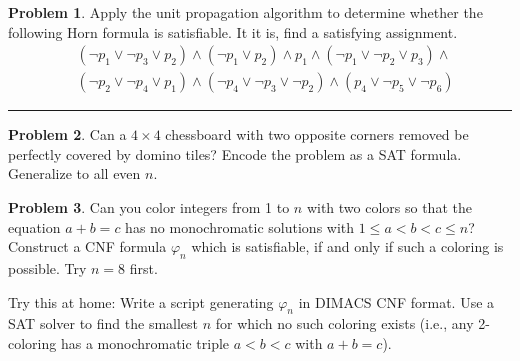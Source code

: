 \documentclass{amsart}
\theoremstyle{definition}
\newtheorem{problem}{Problem}
\begin{document}
\bigskip\begin{problem}
Apply the unit propagation algorithm to determine whether the following Horn formula is satisfiable. It it is, find a satisfying assignment.
\begin{align*}
&(\neg p_1 \vee \neg p_3 \vee p_2)\wedge(\neg p_1 \vee p_2)\wedge p_1 \wedge (\neg p_1 \vee \neg p_2 \vee p_3)\wedge \\
&(\neg p_2 \vee \neg p_4 \vee p_1)\wedge(\neg p_4 \vee \neg p_3 \vee \neg p_2)\wedge(p_4\vee \neg p_5 \vee\neg p_6)
\end{align*}
\end{problem}



\hrule















\bigskip\begin{problem}
Can a $4\times 4$ chessboard with two opposite corners removed be perfectly covered by domino tiles? Encode the problem as a SAT formula. Generalize to all even $n$.
\end{problem}



\bigskip\begin{problem}
Can you color integers from 1 to $n$ with two colors so that the equation $a+b=c$ has no monochromatic solutions with $1\leq a<b<c\leq n$? Construct a CNF formula $\varphi_n$ which is satisfiable, if and only if such a coloring is possible. Try $n=8$ first.

Try this at home: Write a script generating $\varphi_n$ in DIMACS CNF format. Use a SAT solver to find the smallest $n$ for which no such coloring exists (i.e., any 2-coloring has a monochromatic triple $a<b<c$ with $a+b=c$).
\end{problem}
\end{document}
